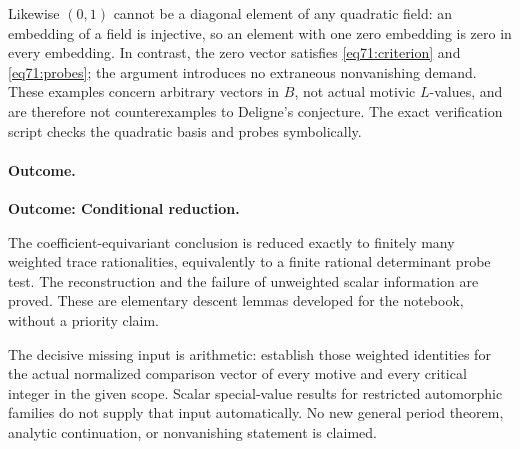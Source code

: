 \documentclass[11pt,a4paper]{article}
\numberwithin{equation}{section}
\begin{document}
Likewise $(0,1)$ cannot be a diagonal element of any quadratic field:
an embedding of a field is injective, so an element with one zero embedding
is zero in every embedding. In contrast, the zero vector satisfies
\eqref{eq71:criterion} and \eqref{eq71:probes}; the argument introduces no
extraneous nonvanishing demand. These examples concern arbitrary vectors
in $B$, not actual motivic $L$-values, and are therefore not counterexamples
to Deligne's conjecture. The exact verification script checks the quadratic
basis and probes symbolically.

\paragraph{Outcome.}
\textbf{Outcome: Conditional reduction.}

The coefficient-equivariant conclusion is reduced exactly to finitely many
weighted trace rationalities, equivalently to a finite rational determinant
probe test. The reconstruction and the failure of unweighted scalar
information are proved. These are elementary descent lemmas developed for
the notebook, without a priority claim.

The decisive missing input is arithmetic: establish those weighted
identities for the actual normalized comparison vector of every motive
and every critical integer in the given scope. Scalar special-value results
for restricted automorphic families do not supply that input automatically.
No new general period theorem, analytic continuation, or nonvanishing
statement is claimed.
\end{document}
